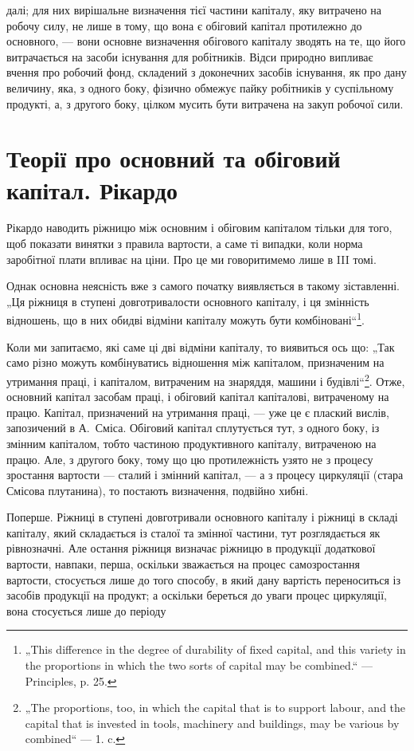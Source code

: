 \parcont{}  %
далі; для них вирішальне визначення тієї частини капіталу, яку витрачено
на робочу силу, не лише в тому, що вона є обіговий капітал протилежно
до основного, — вони основне визначення обігового капіталу зводять
на те, що його витрачається на засоби існування для робітників.
Відси природно випливає вчення про робочий фонд, складений з доконечних
засобів існування, як про дану величину, яка, з одного боку,
фізично обмежує пайку робітників у суспільному продукті, а, з другого
боку, цілком мусить бути витрачена на закуп робочої сили.

\section{Теорії про основний та обіговий капітал. Рікардо}

Рікардо наводить ріжницю між основним і обіговим капіталом тільки
для того, щоб показати винятки з правила вартости, а саме ті випадки,
коли норма заробітної плати впливає на ціни. Про це ми говоритимемо
лише в III томі.

Однак основна неясність вже з самого початку виявляється в такому
зіставленні. „Ця ріжниця в ступені довготривалости основного капіталу,
і ця змінність відношень, що в них обидві відміни капіталу можуть бути
комбіновані“\footnote{
„This difference in the degree of durability of fixed capital, and this variety
in the proportions in which the two sorts of capital may be combined.“ — Principles,
p. 25.
}.

Коли ми запитаємо, які саме ці дві відміни капіталу, то виявиться ось
що: „Так само різно можуть комбінуватись відношення між капіталом,
призначеним на утримання праці, і капіталом, витраченим на знаряддя,
машини і будівлі“\footnote{
„The proportions, too, in which the capital that is to support labour, and the
capital that is invested in tools, machinery and buildings, may be various by combined“
— 1. c.
}. Отже, основний капітал \deq{} засобам праці, і обіговий
капітал \deq{} капіталові, витраченому на працю. Капітал, призначений на
утримання праці, — уже це є плаский вислів, запозичений в А.~Сміса.
Обіговий капітал сплутується тут, з одного боку, із змінним капіталом,
тобто частиною продуктивного капіталу, витраченою на працю. Але,
з другого боку, тому що цю протилежність узято не з процесу зростання
вартости — сталий і змінний капітал, — а з процесу циркуляції (стара Смісова
плутанина), то постають визначення, подвійно хибні.

Поперше. Ріжниці в ступені довготривали основного капіталу і
ріжниці в складі капіталу, який складається із сталої та змінної частини,
тут розглядається як рівнозначні. Але остання ріжниця визначає ріжницю
в продукції додаткової вартости, навпаки, перша, оскільки зважається на
процес самозростання вартости, стосується лише до того способу, в який
дану вартість переноситься із засобів продукції на продукт; а оскільки
береться до уваги процес циркуляції, вона стосується лише до періоду
\parbreak{}  %
